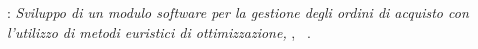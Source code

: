 
\clearpage
{}
\thispagestyle{empty}

\hfill

\vfill

\noindent\myName: \textit{Sviluppo di un modulo software per la gestione degli ordini di acquisto con l'utilizzo di metodi euristici di ottimizzazione,}
\myDegree,
\textcopyright\ \myTime.